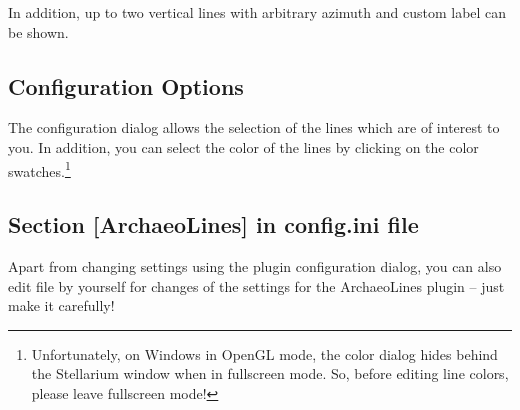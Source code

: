 In addition, up to two vertical lines with arbitrary azimuth and
custom label can be shown.


\subsection{Configuration Options}
\label{sec:plugin:ArchaeoLines:configuration}

The configuration dialog allows the selection of the lines which are
of interest to you. 
%
%
In addition, you can select the color of the lines by clicking on the
color swatches.\footnote{Unfortunately, on Windows in OpenGL mode, the color dialog hides
behind the Stellarium window when in fullscreen mode. So, before
editing line colors, please leave fullscreen mode!}

\subsection*{Section [ArchaeoLines] in config.ini file}

Apart from changing settings using the plugin configuration dialog,
you can also edit  file by yourself for changes of the
settings for the ArchaeoLines plugin -- just make it carefully!

